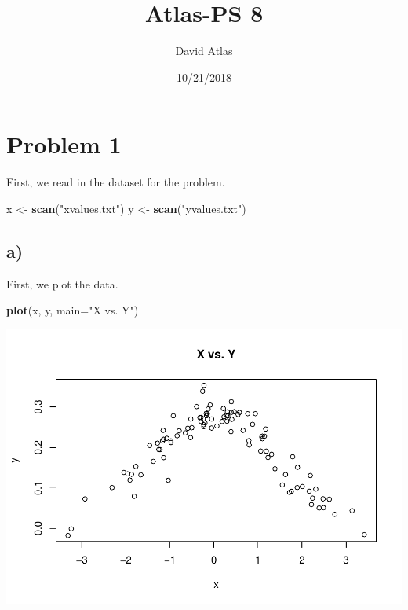 \documentclass[]{article}
\title{Atlas-PS 8}
\author{David Atlas}
\date{10/21/2018}
\newenvironment{Shaded}{\begin{snugshade}}{\end{snugshade}}
\newcommand{\KeywordTok}[1]{\textcolor[rgb]{0.13,0.29,0.53}{\textbf{{#1}}}}
\newcommand{\DataTypeTok}[1]{\textcolor[rgb]{0.13,0.29,0.53}{{#1}}}
\newcommand{\StringTok}[1]{\textcolor[rgb]{0.31,0.60,0.02}{{#1}}}
\newcommand{\NormalTok}[1]{{#1}}
\begin{document}
\maketitle

\newcommand{\summ}{\sum_{i=1}^n}



\section{Problem 1}\label{problem-1}

First, we read in the dataset for the problem.

\begin{Shaded}
\begin{Highlighting}[]
\NormalTok{x <-}\StringTok{ }\KeywordTok{scan}\NormalTok{(}\StringTok{"xvalues.txt"}\NormalTok{)}
\NormalTok{y <-}\StringTok{ }\KeywordTok{scan}\NormalTok{(}\StringTok{"yvalues.txt"}\NormalTok{)}
\end{Highlighting}
\end{Shaded}

\subsection{a)}\label{a}

First, we plot the data.

\begin{Shaded}
\begin{Highlighting}[]
\KeywordTok{plot}\NormalTok{(x, y, }\DataTypeTok{main=}\StringTok{"X vs. Y"}\NormalTok{)}
\end{Highlighting}
\end{Shaded}

\includegraphics{Atlas-PS_8_files/figure-latex/unnamed-chunk-2-1.pdf}
\end{document}
